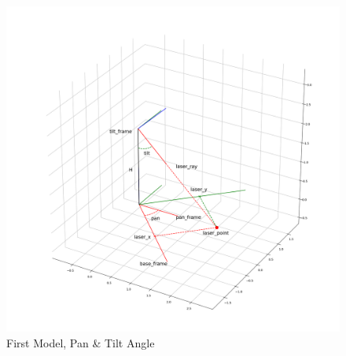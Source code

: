 \begin{figure}
	\centering
	\includegraphics[width=\textwidth]{img/model1XY.png}%
	\caption{First Model, Pan \& Tilt Angle}
	\label{fig:firstModelPanTilt}
\end{figure}

\\

